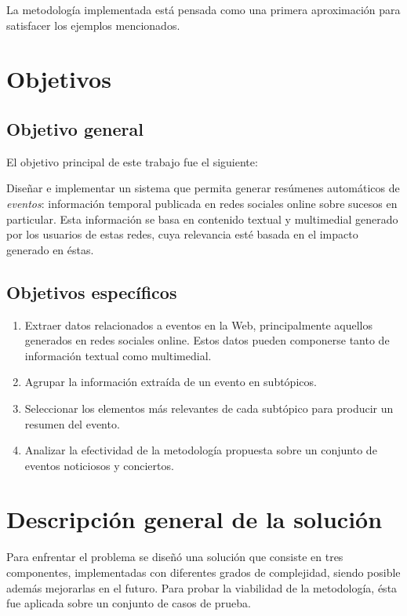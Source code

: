   La metodología implementada está pensada como una primera aproximación para
  satisfacer los ejemplos mencionados.

\section{Objetivos}
\label{sec-1.2}

\subsection{Objetivo general}
\label{sec-1.2.1}


    El objetivo principal de este trabajo fue el siguiente:

    Diseñar e implementar un sistema que permita generar resúmenes
    automáticos de \emph{eventos}: información temporal publicada en redes
    sociales online sobre sucesos en particular. Esta información se
    basa en contenido textual y multimedial generado por los usuarios
    de estas redes, cuya relevancia esté basada en el impacto generado en
    éstas.


\subsection{Objetivos específicos}
\label{sec-1.2.2}


\begin{enumerate}
\item Extraer datos relacionados a eventos en la Web, principalmente
       aquellos generados en redes sociales online. Estos datos pueden
       componerse tanto de información textual como multimedial.
\item Agrupar la información extraída de un evento en subtópicos.
\item Seleccionar los elementos más relevantes de cada subtópico para
       producir un resumen del evento.
\item Analizar la efectividad de la metodología propuesta sobre un
       conjunto de eventos noticiosos y conciertos.
\end{enumerate}


\section{Descripción general de la solución}
\label{sec-1.3}


   Para enfrentar el problema se diseñó una solución que consiste en
   tres componentes, implementadas con diferentes
   grados de complejidad, siendo posible además mejorarlas en el
   futuro. Para probar la viabilidad de la metodología, ésta fue
   aplicada sobre un conjunto de casos de prueba.

